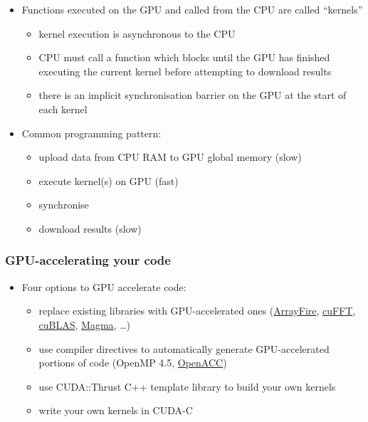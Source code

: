 \begin{itemize}
\itemsep1pt\parskip0pt
\item
  Functions executed on the GPU and called from the CPU are called
  ``kernels''

  \begin{itemize}
  \itemsep1pt\parskip0pt
  \item
    kernel execution is asynchronous to the CPU
  \item
    CPU must call a function which blocks until the GPU has finished
    executing the current kernel before attempting to download results
  \item
    there is an implicit synchronisation barrier on the GPU at the start
    of each kernel
  \end{itemize}
\item
  Common programming pattern:

  \begin{itemize}
  \itemsep1pt\parskip0pt
  \item
    upload data from CPU RAM to GPU global memory (slow)
  \item
    execute kernel(s) on GPU (fast)
  \item
    synchronise
  \item
    download results (slow)
  \end{itemize}
\end{itemize}

\subsubsection{GPU-accelerating your
code}\label{gpu-accelerating-your-code}

\begin{itemize}
\itemsep1pt\parskip0pt
\item
  Four options to GPU accelerate code:

  \begin{itemize}
  \itemsep1pt\parskip0pt
  \item
    replace existing libraries with GPU-accelerated ones
    (\href{https://arrayfire.com/}{ArrayFire},
    \href{https://developer.nvidia.com/cufft}{cuFFT},
    \href{https://developer.nvidia.com/cublas}{cuBLAS},
    \href{http://icl.cs.utk.edu/magma/}{Magma}, \ldots{})
  \item
    use compiler directives to automatically generate GPU-accelerated
    portions of code (OpenMP 4.5,
    \href{http://www.openacc.org/}{OpenACC})
  \item
    use CUDA::Thrust C++ template library to build your own kernels
  \item
    write your own kernels in CUDA-C
  \end{itemize}
\end{itemize}

